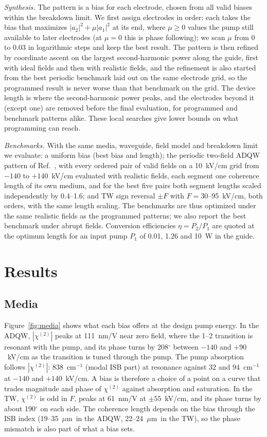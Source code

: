 \documentclass[11pt]{article}
\newcommand{\chitwo}{\chi^{(2)}}
\newcommand{\um}{~$\mu$m}
\begin{document}
\emph{Synthesis.} The pattern is a bias for each electrode, chosen from all valid biases within the breakdown limit. We first assign electrodes in order: each takes the bias that maximizes $|a_2|^2+\mu|a_1|^2$ at its end, where $\mu\ge0$ values the pump still available to later electrodes (at $\mu=0$ this is phase following); we scan $\mu$ from 0 to 0.03 in logarithmic steps and keep the best result. The pattern is then refined by coordinate ascent on the largest second-harmonic power along the guide, first with ideal fields and then with realistic fields, and the refinement is also started from the best periodic benchmark laid out on the same electrode grid, so the programmed result is never worse than that benchmark on the grid. The device length is where the second-harmonic power peaks, and the electrodes beyond it (except one) are removed before the final evaluation, for programmed and benchmark patterns alike. These local searches give lower bounds on what programming can reach.

\emph{Benchmarks.} With the same media, waveguide, field model and breakdown limit we evaluate: a uniform bias (best bias and length); the periodic two-field ADQW pattern of Ref.~\cite{OwnbyN1}, with every ordered pair of valid fields on a 10~kV/cm grid from $-140$ to $+140$~kV/cm evaluated with realistic fields, each segment one coherence length of its own medium, and for the best five pairs both segment lengths scaled independently by 0.4--1.6; and TW sign reversal $\pm F$ with $F=30$--95~kV/cm, both orders, with the same length scaling. The benchmarks are thus optimized under the same realistic fields as the programmed patterns; we also report the best benchmark under abrupt fields. Conversion efficiencies $\eta=P_2/P_1$ are quoted at the optimum length for an input pump $P_1$ of 0.01, 1.26 and 10~W in the guide.

\section{Results}\label{sec:results}
\subsection{Media}\label{sec:media}
Figure~\ref{fig:media} shows what each bias offers at the design pump energy. In the ADQW, $|\chitwo|$ peaks at 111~nm/V near zero field, where the 1--2 transition is resonant with the pump, and its phase turns by 208$^\circ$ between $-140$ and $+90$~kV/cm as the transition is tuned through the pump. The pump absorption follows $|\chitwo|$: 838~cm$^{-1}$ (modal ISB part) at resonance against 32 and 94~cm$^{-1}$ at $-140$ and $+140$~kV/cm. A bias is therefore a choice of a point on a curve that trades magnitude and phase of $\chitwo$ against absorption and saturation. In the TW, $\chitwo$ is odd in $F$, peaks at 61~nm/V at $\pm55$~kV/cm, and its phase turns by about 190$^\circ$ on each side. The coherence length depends on the bias through the ISB index (19--35\um\ in the ADQW, 22--24\um\ in the TW), so the phase mismatch is also part of what a bias sets.
\end{document}
